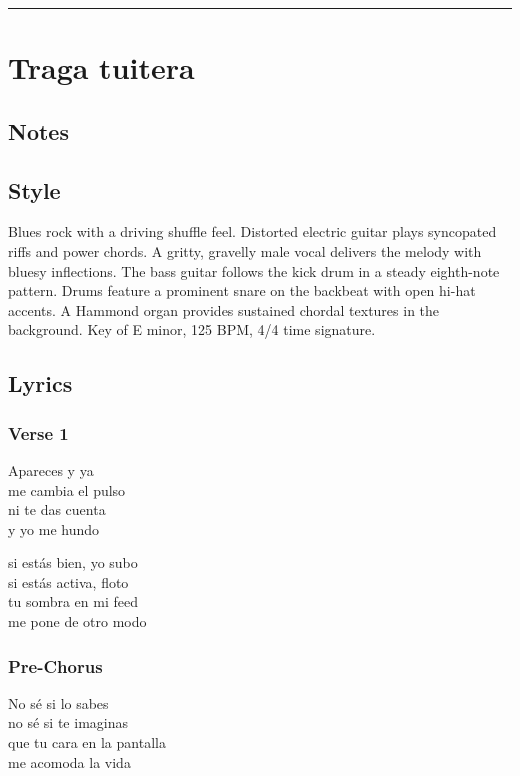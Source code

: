 \begin{center}\rule{0.5\linewidth}{0.5pt}\end{center}

\section{Traga tuitera}\label{traga-tuitera}

\subsection{Notes}\label{notes-20}

\subsection{Style}\label{style-19}

Blues rock with a driving shuffle feel. Distorted electric guitar plays
syncopated riffs and power chords. A gritty, gravelly male vocal
delivers the melody with bluesy inflections. The bass guitar follows the
kick drum in a steady eighth-note pattern. Drums feature a prominent
snare on the backbeat with open hi-hat accents. A Hammond organ provides
sustained chordal textures in the background. Key of E minor, 125 BPM,
4/4 time signature.

\subsection{Lyrics}\label{lyrics-19}

\subsubsection{Verse 1}\label{verse-1-11}

Apareces y ya\\
me cambia el pulso\\
ni te das cuenta\\
y yo me hundo

si estás bien, yo subo\\
si estás activa, floto\\
tu sombra en mi feed\\
me pone de otro modo

\subsubsection{Pre-Chorus}\label{pre-chorus-14}

No sé si lo sabes\\
no sé si te imaginas\\
que tu cara en la pantalla\\
me acomoda la vida

